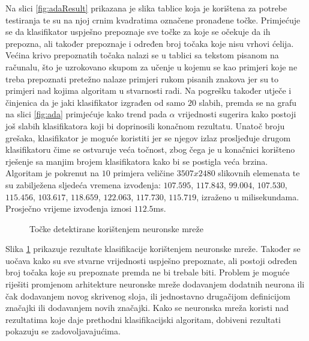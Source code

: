\documentclass[times, utf8, zavrsni, numeric]{fer}
\begin{document}
Na slici \ref{fig:adaResult} prikazana je slika tablice koja je korištena za potrebe testiranja te su na njoj crnim kvadratima označene pronađene točke.
Primjećuje se da klasifikator uspješno prepoznaje sve točke za koje se očekuje da ih prepozna, ali također prepoznaje i određen broj točaka koje nisu vrhovi ćelija.
Većina krivo prepoznatih točaka nalazi se u tablici sa tekstom pisanom na računalu, što je uzrokovano skupom za učenje u kojemu se kao primjeri koje ne treba prepoznati pretežno nalaze primjeri rukom pisanih znakova jer su to primjeri nad kojima algoritam u stvarnosti radi.
Na pogrešku također utječe i činjenica da je jaki klasifikator izgrađen od samo $20$ slabih, premda se na grafu na slici \ref{fig:ada} primjećuje kako trend pada $\alpha$ vrijednosti sugerira kako postoji još slabih klasifikatora koji bi doprinosili konačnom rezultatu.
Unatoč broju grešaka, klasifikator je moguće koristiti jer se njegov izlaz prosljeđuje drugom klasifikatoru čime se ostvaruje veća točnost, zbog čega je u konačnici korišteno rješenje sa manjim brojem klasifikatora kako bi se postigla veća brzina.\\

Algoritam je pokrenut na $10$ primjera veličine $3507x2480$ slikovnih elemenata te su zabilježena sljedeća vremena izvođenja: $107.595$, $117.843$, $99.004$, $107.530$, $115.456$, $103.617$, $118.659$, $122.063$, $117.730$, $115.719$, izraženo u milisekundama. 
Prosječno vrijeme izvođenja iznosi $112.5$ms.

\begin{figure}[!ht]
    \centering
    \captionsetup{justification=centering}
    \caption{Točke detektirane korištenjem neuronske mreže}
    \label{fig:neuralResult}
\end{figure}

Slika \ref{fig:neuralResult} prikazuje rezultate klasifikacije korištenjem neuronske mreže. 
Također se uočava kako su sve stvarne vrijednosti uspješno prepoznate, ali postoji određen broj točaka koje su prepoznate premda ne bi trebale biti. 
Problem je moguće riješiti promjenom arhitekture neuronske mreže dodavanjem dodatnih neurona ili čak dodavanjem novog skrivenog sloja, ili jednostavno drugačijom definicijom značajki ili dodavanjem novih značajki.
Kako se neuronska mreža koristi nad rezultatima koje daje prethodni klasifikacijski algoritam, dobiveni rezultati pokazuju se zadovoljavajućima.\\
\end{document}
